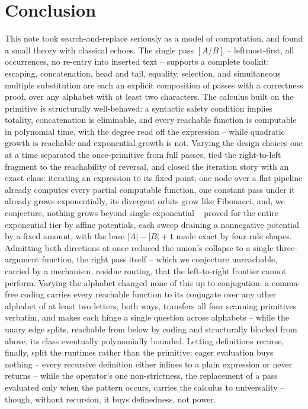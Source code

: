 \documentclass[runningheads,envcountsect]{llncs}
\begin{document}
\section{Conclusion}

This note took search-and-replace seriously as a model of computation, and found a small theory with classical echoes. The single pass $[A/B]$ -- leftmost-first, all occurrences, no re-entry into inserted text -- supports a complete toolkit: escaping, concatenation, head and tail, equality, selection, and simultaneous multiple substitution are each an explicit composition of passes with a correctness proof, over any alphabet with at least two characters. The calculus built on the primitive is structurally well-behaved: a syntactic safety condition implies totality, concatenation is eliminable, and every reachable function is computable in polynomial time, with the degree read off the expression -- while quadratic growth is reachable and exponential growth is not. Varying the design choices one at a time separated the once-primitive from full passes, tied the right-to-left fragment to the reachability of reversal, and closed the iteration story with an exact class: iterating an expression to its fixed point, one node over a flat pipeline already computes every partial computable function, one constant pass under it already grows exponentially, its divergent orbits grow like Fibonacci, and, we conjecture, nothing grows beyond single-exponential -- proved for the entire exponential tier by affine potentials, each sweep draining a nonnegative potential by a fixed amount, with the base $|A| - |B| + 1$ made exact by four rule shapes. Admitting both directions at once reduced the union's collapse to a single three-argument function, the right pass itself -- which we conjecture unreachable, carried by a mechanism, residue routing, that the left-to-right frontier cannot perform. Varying the alphabet changed none of this up to conjugation: a comma-free coding carries every reachable function to its conjugate over any other alphabet of at least two letters, both ways, transfers all four scanning primitives verbatim, and makes each hinge a single question across alphabets -- while the unary edge splits, reachable from below by coding and structurally blocked from above, its class eventually polynomially bounded. Letting definitions recurse, finally, split the runtimes rather than the primitive: eager evaluation buys nothing -- every recursive definition either inlines to a plain expression or never returns -- while the operator's one non-strictness, the replacement of a pass evaluated only when the pattern occurs, carries the calculus to universality -- though, without recursion, it buys definedness, not power.
\end{document}
